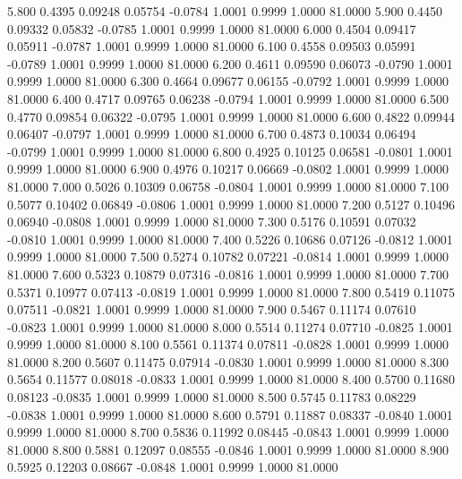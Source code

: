    5.800   0.4395   0.09248   0.05754  -0.0784   1.0001   0.9999   1.0000  81.0000
   5.900   0.4450   0.09332   0.05832  -0.0785   1.0001   0.9999   1.0000  81.0000
   6.000   0.4504   0.09417   0.05911  -0.0787   1.0001   0.9999   1.0000  81.0000
   6.100   0.4558   0.09503   0.05991  -0.0789   1.0001   0.9999   1.0000  81.0000
   6.200   0.4611   0.09590   0.06073  -0.0790   1.0001   0.9999   1.0000  81.0000
   6.300   0.4664   0.09677   0.06155  -0.0792   1.0001   0.9999   1.0000  81.0000
   6.400   0.4717   0.09765   0.06238  -0.0794   1.0001   0.9999   1.0000  81.0000
   6.500   0.4770   0.09854   0.06322  -0.0795   1.0001   0.9999   1.0000  81.0000
   6.600   0.4822   0.09944   0.06407  -0.0797   1.0001   0.9999   1.0000  81.0000
   6.700   0.4873   0.10034   0.06494  -0.0799   1.0001   0.9999   1.0000  81.0000
   6.800   0.4925   0.10125   0.06581  -0.0801   1.0001   0.9999   1.0000  81.0000
   6.900   0.4976   0.10217   0.06669  -0.0802   1.0001   0.9999   1.0000  81.0000
   7.000   0.5026   0.10309   0.06758  -0.0804   1.0001   0.9999   1.0000  81.0000
   7.100   0.5077   0.10402   0.06849  -0.0806   1.0001   0.9999   1.0000  81.0000
   7.200   0.5127   0.10496   0.06940  -0.0808   1.0001   0.9999   1.0000  81.0000
   7.300   0.5176   0.10591   0.07032  -0.0810   1.0001   0.9999   1.0000  81.0000
   7.400   0.5226   0.10686   0.07126  -0.0812   1.0001   0.9999   1.0000  81.0000
   7.500   0.5274   0.10782   0.07221  -0.0814   1.0001   0.9999   1.0000  81.0000
   7.600   0.5323   0.10879   0.07316  -0.0816   1.0001   0.9999   1.0000  81.0000
   7.700   0.5371   0.10977   0.07413  -0.0819   1.0001   0.9999   1.0000  81.0000
   7.800   0.5419   0.11075   0.07511  -0.0821   1.0001   0.9999   1.0000  81.0000
   7.900   0.5467   0.11174   0.07610  -0.0823   1.0001   0.9999   1.0000  81.0000
   8.000   0.5514   0.11274   0.07710  -0.0825   1.0001   0.9999   1.0000  81.0000
   8.100   0.5561   0.11374   0.07811  -0.0828   1.0001   0.9999   1.0000  81.0000
   8.200   0.5607   0.11475   0.07914  -0.0830   1.0001   0.9999   1.0000  81.0000
   8.300   0.5654   0.11577   0.08018  -0.0833   1.0001   0.9999   1.0000  81.0000
   8.400   0.5700   0.11680   0.08123  -0.0835   1.0001   0.9999   1.0000  81.0000
   8.500   0.5745   0.11783   0.08229  -0.0838   1.0001   0.9999   1.0000  81.0000
   8.600   0.5791   0.11887   0.08337  -0.0840   1.0001   0.9999   1.0000  81.0000
   8.700   0.5836   0.11992   0.08445  -0.0843   1.0001   0.9999   1.0000  81.0000
   8.800   0.5881   0.12097   0.08555  -0.0846   1.0001   0.9999   1.0000  81.0000
   8.900   0.5925   0.12203   0.08667  -0.0848   1.0001   0.9999   1.0000  81.0000
